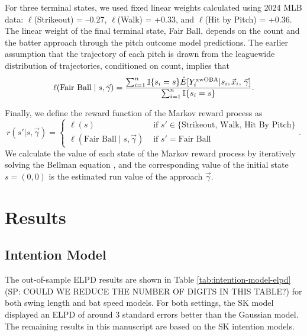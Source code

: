 \documentclass{article}
\begin{document}
      For three terminal states, we used fixed linear weights calculated using 2024 MLB data: $\ell$(Strikeout) = --0.27, $\ell$(Walk) = +0.33, and $\ell$(Hit by Pitch) = +0.36. The linear weight of the final terminal state, Fair Ball, depends on the count and the batter approach through the pitch outcome model predictions. The earlier assumption that the trajectory of each pitch is drawn from the leaguewide distribution of trajectories, conditioned on count, implies that
      \begin{equation*}
        \ell(\mbox{Fair Ball} \mid s, \vec\gamma) = \frac{
          \sum_{i = 1}^n \mathbb{I}\{s_i = s\} \hat E[Y_i^{\mbox{\scriptsize xwOBA}} | s_i, \vec x_i,\, \vec\gamma]
        }{
          \sum_{i = 1}^n \mathbb{I}\{s_i = s\}
        }.
      \end{equation*}

      Finally, we define the reward function of the Markov reward process as
      \begin{equation*}
          r(s' | s, \vec\gamma) = \begin{cases}
            \ell(s) & \mbox{ if } s' \in \{\mbox{Strikeout, Walk, Hit By Pitch}\}\\
            \ell(\mbox{Fair Ball} \mid s, \vec\gamma) & \mbox{ if } s' = \mbox{Fair Ball}
          \end{cases}.
      \end{equation*}
      We calculate the value of each state of the Markov reward process by iteratively solving the Bellman equation \citep{bellman_dynamic_1957}, and the corresponding value of the initial state $s = (0, 0)$ is the estimated run value of the approach $\vec\gamma$.

  \section{Results}
  \label{sec:results}
  

    \subsection{Intention Model}
    \label{sec:results-intention}

      The out-of-sample ELPD results are shown in Table \ref{tab:intention-model-elpd} (SP: COULD WE REDUCE THE NUMBER OF DIGITS IN THIS TABLE?) for both swing length and bat speed models. For both settings, the SK model displayed an ELPD of around 3 standard errors better than the Gaussian model. The remaining results in this manuscript are based on the SK intention models.
\end{document}

